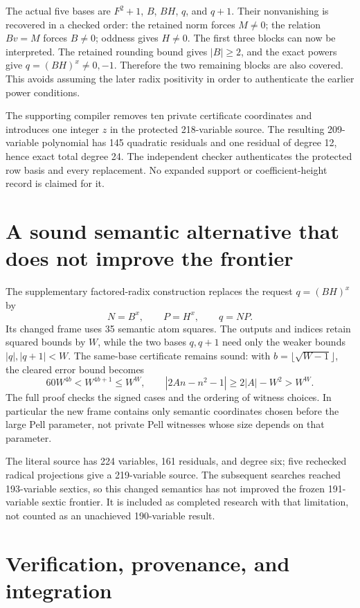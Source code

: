 \documentclass[11pt]{article}
\begin{document}
The actual five bases are $F^2+1$, $B$, $BH$, $q$, and $q+1$.
Their nonvanishing is recovered in a checked order: the retained norm
forces $M\ne0$; the relation $Bv=M$ forces $B\ne0$; oddness gives
$H\ne0$. The first three blocks can now be interpreted. The retained
rounding bound gives $|B|\ge2$, and the exact powers give
$q=(BH)^x\ne0,-1$. Therefore the two remaining blocks are also covered.
This avoids assuming the later radix positivity in order to authenticate
the earlier power conditions.

The supporting compiler removes ten private certificate coordinates
and introduces one integer $z$ in the protected 218-variable source.
The resulting 209-variable polynomial has 145 quadratic residuals and
one residual of degree 12, hence exact total degree 24. The independent
checker authenticates the protected row basis and every replacement.
No expanded support or coefficient-height record is claimed for it.

\section{A sound semantic alternative that does not improve the frontier}

The supplementary factored-radix construction replaces the request
$q=(BH)^x$ by
\[
                  N=B^x,\qquad P=H^x,\qquad q=NP.
\]
Its changed frame uses 35 semantic atom squares. The outputs and indices
retain squared bounds by $W$, while the two bases $q,q+1$ need only the
weaker bounds $|q|,|q+1|<W$. The same-base certificate remains sound:
with $b=\lfloor\sqrt{W-1}\rfloor$, the cleared error bound becomes
\[
 60W^{4b}<W^{4b+1}\le W^W,
 \qquad |2An-n^2-1|\ge2|A|-W^2>W^W.
\]
The full proof checks the signed cases and the ordering of witness choices.
In particular the new frame contains only semantic coordinates chosen
before the large Pell parameter, not private Pell witnesses whose size
depends on that parameter.

The literal source has 224 variables, 161 residuals, and degree six;
five rechecked radical projections give a 219-variable source. The
subsequent searches reached 193-variable sextics, so this changed
semantics has not improved the frozen 191-variable sextic frontier.
It is included as completed research with that limitation, not counted
as an unachieved 190-variable result.

\section{Verification, provenance, and integration}\label{sec:verification}
\end{document}
